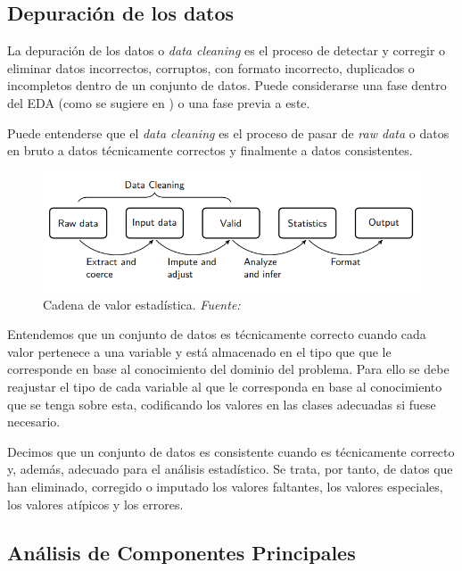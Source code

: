 \documentclass[12pt,a4paper,]{book}
\numberwithin{dummy}{section}
\theoremstyle{ocrenumbox}
\theoremstyle{blacknumex}
\theoremstyle{blacknumbox}
\theoremstyle{ocrenum}
\theoremstyle{ocrenum}
\begin{document}
\hypertarget{depuraciuxf3n-de-los-datos}{%
\subsection{Depuración de los datos}\label{depuraciuxf3n-de-los-datos}}

La depuración de los datos o \emph{data cleaning} es el proceso de
detectar y corregir o eliminar datos incorrectos, corruptos, con formato
incorrecto, duplicados o incompletos dentro de un conjunto de datos.
Puede considerarse una fase dentro del EDA (como se sugiere en
\citet{wickham2016r}) o una fase previa a este.

Puede entenderse que el \emph{data cleaning} es el proceso de pasar de
\emph{raw data} o datos en bruto a datos técnicamente correctos y
finalmente a datos consistentes.

\begin{figure}[H]

{\centering \includegraphics[width=0.95\linewidth]{graficos/statistical_value_chain} 

}

\caption{Cadena de valor estadística. \it Fuente: \citet{van2018statistical}}\label{fig:unnamed-chunk-2}
\end{figure}

Entendemos que un conjunto de datos es técnicamente correcto cuando cada
valor pertenece a una variable y está almacenado en el tipo que que le
corresponde en base al conocimiento del dominio del problema. Para ello
se debe reajustar el tipo de cada variable al que le corresponda en base
al conocimiento que se tenga sobre esta, codificando los valores en las
clases adecuadas si fuese necesario.

Decimos que un conjunto de datos es consistente cuando es técnicamente
correcto y, además, adecuado para el análisis estadístico. Se trata, por
tanto, de datos que han eliminado, corregido o imputado los valores
faltantes, los valores especiales, los valores atípicos y los errores.

\hypertarget{anuxe1lisis-de-componentes-principales}{%
\subsection{Análisis de Componentes
Principales}\label{anuxe1lisis-de-componentes-principales}}
\end{document}
